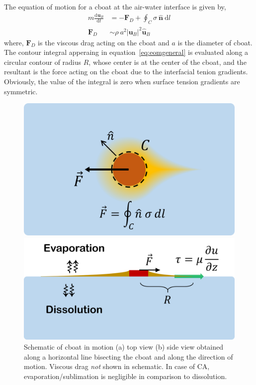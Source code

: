 \documentclass[journal=langd5, manuscript=article, layout=onecolumn]{achemso}
\newcommand{\tdc}[3][]{\frac{\mathrm{d}^{#1}#2}{\mathrm{d}#3^{#1}}} %
\newcommand{\td}[1]{\mathrm{d}#1}
\begin{document}
The equation of motion for a cboat at the air-water interface is given by,
\begin{equation}\label{eq:eomgeneral}
\begin{aligned}
m \tdc{\mathbf{u}_{B}}{t} &= -\mathbf{F}_{D} + \oint_{C} \sigma \ \hat{\mathbf{n}} \ \td{l} \\
\mathbf{F}_{D} &\sim \rho\ a^{2} \left|\mathbf{u}_{B}\right|^{2} \hat{\mathbf{u}}_{B}
\end{aligned}
\end{equation}
where, $\mathbf{F}_{D}$ is the viscous drag acting on the cboat and $a$ is the diameter of cboat. The contour integral apperaing in equation~\ref{eq:eomgeneral} is evaluated along a circular contour of radius $R$, whose center is at the center of the cboat, and the resultant is the force acting on the cboat due to the interfacial tenion gradients. Obviously, the value of the integral is zero when surface tension gradients are symmetric. 
\begin{figure}[ht]
    \centering
	\begin{minipage}[c]{0.4\linewidth}
		\centering
		\includegraphics[width=\textwidth]{schematic_a_v1.png}
	\end{minipage}
	\begin{minipage}[c]{0.4\linewidth}
		\centering
		\includegraphics[width=\textwidth]{schematic_b_v1.png}
	\end{minipage}
	\caption{Schematic of cboat in motion (a) top view (b) side view obtained along a horizontal line bisecting the cboat and along the direction of motion. Viscous drag \emph{not} shown in schematic. In case of CA, evaporation/sublimation is negligible in comparison to dissolution.}\label{fig:schematic}
\end{figure}
\end{document}
